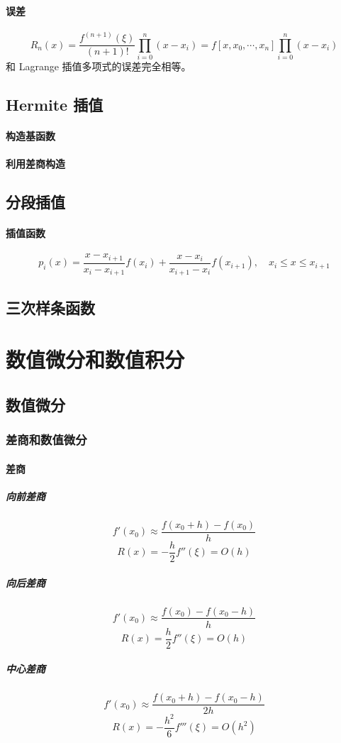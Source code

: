 \documentclass[a4paper,12pt]{article}
\begin{document}
\paragraph{误差}
\[
R_n(x)=\frac{f^{(n+1)}(\xi)}{(n+1)!}\prod_{i=0}^{n}(x-x_i)=f[x,x_0,\cdots,x_n]\prod_{i=0}^{n}(x-x_i)
\]
和 Lagrange 插值多项式的误差完全相等。
\subsection{Hermite 插值}
\paragraph{构造基函数}
\paragraph{利用差商构造}
\subsection{分段插值}
\paragraph{插值函数}
\[
p_i(x)=\frac{x-x_{i+1}}{x_i-x_{i+1}}f(x_i)+\frac{x-x_{i}}{x_{i+1}-x_{i}}f(x_{i+1}),\quad x_i\le x\le x_{i+1}
\]
\subsection{三次样条函数}

\section{数值微分和数值积分}
\subsection{数值微分}
\subsubsection{差商和数值微分}
\paragraph{差商}
\subparagraph{向前差商}
\[
f'(x_0)\approx\frac{f(x_0+h)-f(x_0)}{h}
\]
\[
R(x)=-\frac{h}{2}f''(\xi)=O(h)
\]
\subparagraph{向后差商}
\[
f'(x_0)\approx\frac{f(x_0)-f(x_0-h)}{h}
\]
\[
R(x)=\frac{h}{2}f''(\xi)=O(h)
\]
\subparagraph{中心差商}
\[
f'(x_0)\approx\frac{f(x_0+h)-f(x_0-h)}{2h}
\]
\[
R(x)=-\frac{h^2}{6}f'''(\xi)=O(h^2)
\]
\end{document}
